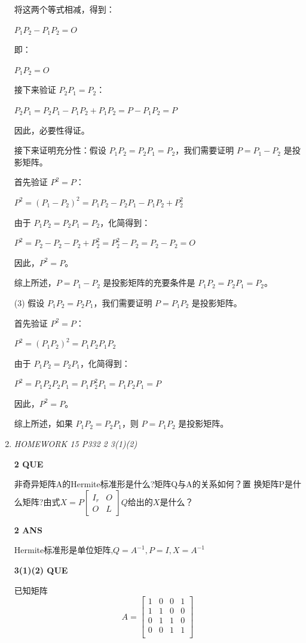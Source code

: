 \documentclass[11pt,letterpaper]{ctexart}
\begin{document}
\begin{enumerate}
将这两个等式相减，得到：

$P_1P_2 - P_1P_2 = O$

即：

$P_1P_2 = O$

接下来验证 $P_2P_1 = P_2$：

$P_2P_1 = P_2P_1 - P_1P_2 + P_1P_2 = P - P_1P_2 = P$

因此，必要性得证。

接下来证明充分性：假设 $P_1P_2 = P_2P_1 = P_2$，我们需要证明 $P = P_1 - P_2$ 是投影矩阵。

首先验证 $P^2 = P$：

$P^2 = (P_1 - P_2)^2 = P_1P_2 - P_2P_1 - P_1P_2 + P_2^2$

由于 $P_1P_2 = P_2P_1 = P_2$，化简得到：

$P^2 = P_2 - P_2 - P_2 + P_2^2 = P_2^2 - P_2 = P_2 - P_2 = O$

因此，$P^2 = P$。

综上所述，$P = P_1 - P_2$ 是投影矩阵的充要条件是 $P_1P_2 = P_2P_1 = P_2$。

(3) 假设 $P_1P_2 = P_2P_1$，我们需要证明 $P = P_1P_2$ 是投影矩阵。

首先验证 $P^2 = P$：

$P^2 = (P_1P_2)^2 = P_1P_2P_1P_2$

由于 $P_1P_2 = P_2P_1$，化简得到：

$P^2 = P_1P_2P_2P_1 = P_1P_2^2P_1 = P_1P_2P_1 = P$

因此，$P^2 = P$。

综上所述，如果 $P_1P_2 = P_2P_1$，则 $P = P_1P_2$ 是投影矩阵。

\item \textit{HOMEWORK 15 {P332 2 3(1)(2)}}%

\textbf{2 QUE}
\bigskip

非奇异矩阵A的Hermite标准形是什么?矩阵Q与A的关系如何？置 
换矩阵P是什么矩阵?由式$X = P\begin{bmatrix}
	I_r & O \\
	O & L
\end{bmatrix}Q$给出的$X$是什么？

\textbf{2 ANS}
\bigskip

Hermite标准形是单位矩阵,$Q= A^{-1}, P = I, X = A^{-1}$


\textbf{3(1)(2) QUE}
\bigskip

已知矩阵
\[A = \begin{bmatrix}
	1 & 0 & 0 & 1 \\
	1 & 1 & 0 & 0 \\
	0 & 1 & 1 & 0 \\
	0 & 0 & 1 & 1 \\
\end{bmatrix}\]


\end{enumerate}
\end{document}
